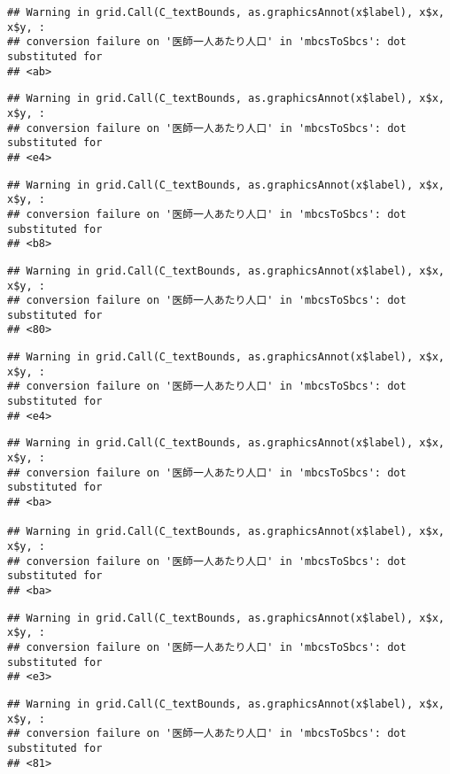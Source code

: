 \documentclass[
]{article}
\begin{document}
\begin{verbatim}
## Warning in grid.Call(C_textBounds, as.graphicsAnnot(x$label), x$x, x$y, :
## conversion failure on '医師一人あたり人口' in 'mbcsToSbcs': dot substituted for
## <ab>
\end{verbatim}

\begin{verbatim}
## Warning in grid.Call(C_textBounds, as.graphicsAnnot(x$label), x$x, x$y, :
## conversion failure on '医師一人あたり人口' in 'mbcsToSbcs': dot substituted for
## <e4>
\end{verbatim}

\begin{verbatim}
## Warning in grid.Call(C_textBounds, as.graphicsAnnot(x$label), x$x, x$y, :
## conversion failure on '医師一人あたり人口' in 'mbcsToSbcs': dot substituted for
## <b8>
\end{verbatim}

\begin{verbatim}
## Warning in grid.Call(C_textBounds, as.graphicsAnnot(x$label), x$x, x$y, :
## conversion failure on '医師一人あたり人口' in 'mbcsToSbcs': dot substituted for
## <80>
\end{verbatim}

\begin{verbatim}
## Warning in grid.Call(C_textBounds, as.graphicsAnnot(x$label), x$x, x$y, :
## conversion failure on '医師一人あたり人口' in 'mbcsToSbcs': dot substituted for
## <e4>
\end{verbatim}

\begin{verbatim}
## Warning in grid.Call(C_textBounds, as.graphicsAnnot(x$label), x$x, x$y, :
## conversion failure on '医師一人あたり人口' in 'mbcsToSbcs': dot substituted for
## <ba>

## Warning in grid.Call(C_textBounds, as.graphicsAnnot(x$label), x$x, x$y, :
## conversion failure on '医師一人あたり人口' in 'mbcsToSbcs': dot substituted for
## <ba>
\end{verbatim}

\begin{verbatim}
## Warning in grid.Call(C_textBounds, as.graphicsAnnot(x$label), x$x, x$y, :
## conversion failure on '医師一人あたり人口' in 'mbcsToSbcs': dot substituted for
## <e3>
\end{verbatim}

\begin{verbatim}
## Warning in grid.Call(C_textBounds, as.graphicsAnnot(x$label), x$x, x$y, :
## conversion failure on '医師一人あたり人口' in 'mbcsToSbcs': dot substituted for
## <81>
\end{verbatim}
\end{document}
